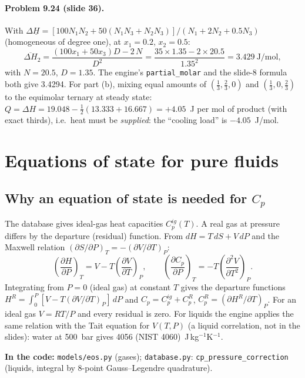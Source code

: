 \documentclass[11pt,a4paper]{article}
\newcommand{\code}[1]{\texttt{\small #1}}
\newcommand{\where}[1]{\par\noindent\textbf{In the code:} #1\par}
\begin{document}
\paragraph{Problem 9.24 (slide 36).} With $\Delta\underline H=[100N_1N_2+50(N_1N_3+N_2N_3)]/(N_1+2N_2+0.5N_3)$
(homogeneous of degree one), at $x_1=0.2$, $x_2=0.5$:
\[
\overline{\Delta H}_2=\frac{(100x_1+50x_3)D-2\,N}{D^2}=\frac{35\times1.35-2\times20.5}{1.35^2}=3.429\ \mathrm{J/mol},
\]
with $N=20.5$, $D=1.35$. The engine's \code{partial\_molar} and the slide-8 formula both give 3.4294.
For part (b), mixing equal amounts of $(\tfrac13,\tfrac23,0)$ and $(\tfrac13,0,\tfrac23)$ to the equimolar
ternary at steady state: $Q=\Delta H=19.048-\tfrac12(13.333+16.667)=+4.05$~J per mol of product (with
exact thirds), i.e.\ heat must be \emph{supplied}: the ``cooling load'' is $-4.05$~J/mol.

\section{Equations of state for pure fluids}

\subsection{Why an equation of state is needed for $C_p$}
The database gives ideal-gas heat capacities $C_p^{ig}(T)$. A real gas at pressure differs by the
departure (residual) function. From $dH=T\,dS+V\,dP$ and the Maxwell relation $(\partial S/\partial P)_T=-(\partial
V/\partial T)_P$:
\[
\left(\frac{\partial H}{\partial P}\right)_T=V-T\left(\frac{\partial V}{\partial T}\right)_P,\qquad
\left(\frac{\partial C_p}{\partial P}\right)_T=-T\left(\frac{\partial^2V}{\partial T^2}\right)_P .
\]
Integrating from $P=0$ (ideal gas) at constant $T$ gives the departure functions
$H^R=\int_0^P[V-T(\partial V/\partial T)_P]\,dP$ and $C_p=C_p^{ig}+C_p^R$, $C_p^R=(\partial H^R/\partial T)_P$.
For an ideal gas $V=RT/P$ and every residual is zero. For liquids the engine applies the same relation with the
Tait equation for $V(T,P)$ (a liquid correlation, not in the slides): water at 500~bar gives 4056
(NIST 4060)~J\,kg$^{-1}$K$^{-1}$.
\where{\code{models/eos.py} (gases); \code{database.py}: \code{cp\_pressure\_correction} (liquids, integral by
8-point Gauss--Legendre quadrature).}
\end{document}
